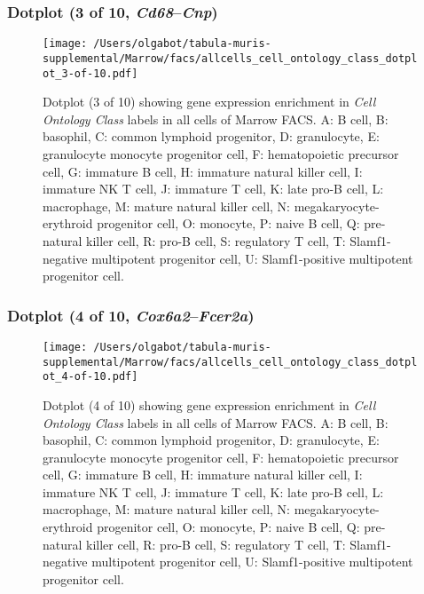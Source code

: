 \subsubsection{Dotplot (3 of 10, \emph{Cd68}--\emph{Cnp})}
\begin{figure}[h]
\centering
\texttt{[image: /Users/olgabot/tabula-muris-supplemental/Marrow/facs/allcells\_cell\_ontology\_class\_dotplot\_3-of-10.pdf]}

\caption{ Dotplot (3 of 10)  showing gene expression enrichment in \emph{Cell Ontology Class} labels in all cells of Marrow FACS. A: B cell, B: basophil, C: common lymphoid progenitor, D: granulocyte, E: granulocyte monocyte progenitor cell, F: hematopoietic precursor cell, G: immature B cell, H: immature natural killer cell, I: immature NK T cell, J: immature T cell, K: late pro-B cell, L: macrophage, M: mature natural killer cell, N: megakaryocyte-erythroid progenitor cell, O: monocyte, P: naive B cell, Q: pre-natural killer cell, R: pro-B cell, S: regulatory T cell, T: Slamf1-negative multipotent progenitor cell, U: Slamf1-positive multipotent progenitor cell.}
\end{figure}


\clearpage

\subsubsection{Dotplot (4 of 10, \emph{Cox6a2}--\emph{Fcer2a})}
\begin{figure}[h]
\centering
\texttt{[image: /Users/olgabot/tabula-muris-supplemental/Marrow/facs/allcells\_cell\_ontology\_class\_dotplot\_4-of-10.pdf]}

\caption{ Dotplot (4 of 10)  showing gene expression enrichment in \emph{Cell Ontology Class} labels in all cells of Marrow FACS. A: B cell, B: basophil, C: common lymphoid progenitor, D: granulocyte, E: granulocyte monocyte progenitor cell, F: hematopoietic precursor cell, G: immature B cell, H: immature natural killer cell, I: immature NK T cell, J: immature T cell, K: late pro-B cell, L: macrophage, M: mature natural killer cell, N: megakaryocyte-erythroid progenitor cell, O: monocyte, P: naive B cell, Q: pre-natural killer cell, R: pro-B cell, S: regulatory T cell, T: Slamf1-negative multipotent progenitor cell, U: Slamf1-positive multipotent progenitor cell.}
\end{figure}


\clearpage

